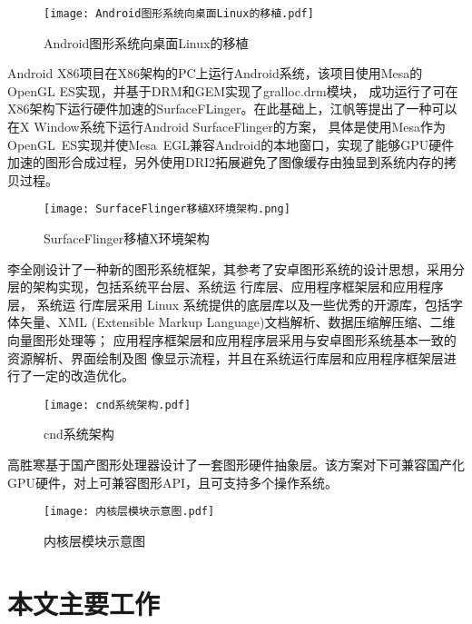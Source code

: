 \begin{figure}[H]
  \centering
  \texttt{[image: Android图形系统向桌面Linux的移植.pdf]}
  \caption{Android图形系统向桌面Linux的移植\cite{张超2012Android}}
\end{figure}

Android X86项目在X86架构的PC上运行Android系统，该项目使用Mesa\cite{mesa}的OpenGL ES实现，并基于DRM\cite{DRM}和GEM\cite{GEM}实现了gralloc.drm模块，
成功运行了可在X86架构下运行硬件加速的SurfaceFLinger\cite{AndroidX86}。在此基础上，江帆等提出了一种可以在X Window系统下运行Android SurfaceFlinger的方案，
具体是使用Mesa作为OpenGL ES实现并使Mesa EGL兼容Android的本地窗口，实现了能够GPU硬件加速的图形合成过程，另外使用DRI2拓展避免了图像缓存由独显到系统内存的拷贝过程\cite{XTYY201710015}。

\begin{figure}[H]
  \centering
  \texttt{[image: SurfaceFlinger移植X环境架构.png]}
  \caption{SurfaceFlinger移植X环境架构\cite{XTYY201710015}}
\end{figure}

李全刚设计了一种新的图形系统框架，其参考了安卓图形系统的设计思想，采用分层的架构实现，包括系统平台层、系统运 行库层、应用程序框架层和应用程序层，
系统运 行库层采用 Linux 系统提供的底层库以及一些优秀的开源库，包括字体矢量、XML (Extensible Markup Language)文档解析、数据压缩解压缩、二维向量图形处理等；
应用程序框架层和应用程序层采用与安卓图形系统基本一致的资源解析、界面绘制及图 像显示流程，并且在系统运行库层和应用程序框架层进行了一定的改造优化\cite{1016779798.nh}。
\begin{figure}[H]
  \centering
  \texttt{[image: cnd系统架构.pdf]}
  \caption{cnd系统架构\cite{1016779798.nh}}
\end{figure}

高胜寒基于国产图形处理器设计了一套图形硬件抽象层\cite{高胜寒2019基于国产}。该方案对下可兼容国产化GPU硬件，对上可兼容图形API，且可支持多个操作系统。
\begin{figure}[H]
  \centering
  \texttt{[image: 内核层模块示意图.pdf]}
  \caption{内核层模块示意图\cite{高胜寒2019基于国产}}
\end{figure}

\section{本文主要工作}

